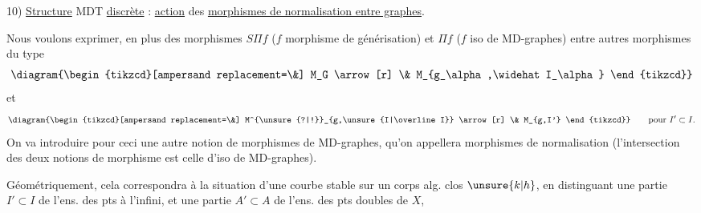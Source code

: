 10) \uline{Structure} MDT \uline{discrète} : \uline{action} des \uline{morphismes de normalisation entre graphes}.

Nous voulons exprimer, en plus des morphismes  $S\Pi f$ ($f$ morphisme de générisation) et $\Pi f$ ($f$ iso de MD-graphes) entre autres  morphismes du type
\[
\diagram{\begin{tikzcd}[ampersand replacement=\&]
M_G \arrow[r] \& M_{g_\alpha,\widehat I_\alpha}
\end{tikzcd}}
\]
et
\[
\diagram{\begin{tikzcd}[ampersand replacement=\&]
M^{\unsure{?|!}}_{g,\unsure{I|\overline I}} \arrow[r] \& M_{g,I'}
\end{tikzcd}}
\qquad\text{pour }I'\subset I.
\]
On va introduire pour ceci une autre notion de morphismes de MD-graphes, qu'on appellera morphismes de normalisation (l'intersection des deux notions de morphisme est celle d'iso de MD-graphes).

Géométriquement, cela correspondra à la situation d'une courbe stable  sur un corps alg. clos $\unsure{k|h}$, en distinguant une partie $I'\subset I$ de l'ens. des pts à l'infini, et une partie $A'\subset A$ de l'ens. des pts doubles de $X$,
